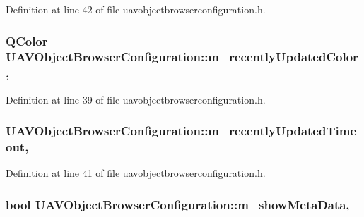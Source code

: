 Definition at line 42 of file uavobjectbrowserconfiguration.\-h.

\hypertarget{group___u_a_v_object_browser_plugin_ga37ba368816fa79530f01aa4447c2fc4d}{
\subsubsection[{m\-\_\-recently\-Updated\-Color}]{\setlength{\rightskip}{0pt plus 5cm}Q\-Color U\-A\-V\-Object\-Browser\-Configuration\-::m\-\_\-recently\-Updated\-Color\hspace{0.3cm}{\ttfamily [read]}, {\ttfamily [write]}}}\label{group___u_a_v_object_browser_plugin_ga37ba368816fa79530f01aa4447c2fc4d}


Definition at line 39 of file uavobjectbrowserconfiguration.\-h.

\hypertarget{group___u_a_v_object_browser_plugin_gabdd8aaa583badc5d3c7545480a372138}{
\subsubsection[{m\-\_\-recently\-Updated\-Timeout}]{ U\-A\-V\-Object\-Browser\-Configuration\-::m\-\_\-recently\-Updated\-Timeout\hspace{0.3cm}{\ttfamily [read]}, {\ttfamily [write]}}}\label{group___u_a_v_object_browser_plugin_gabdd8aaa583badc5d3c7545480a372138}


Definition at line 41 of file uavobjectbrowserconfiguration.\-h.

\hypertarget{group___u_a_v_object_browser_plugin_ga6ae11b3871f2da133017aeffa97aaa0b}{
\subsubsection[{m\-\_\-show\-Meta\-Data}]{\setlength{\rightskip}{0pt plus 5cm}bool U\-A\-V\-Object\-Browser\-Configuration\-::m\-\_\-show\-Meta\-Data\hspace{0.3cm}{\ttfamily [read]}, {\ttfamily [write]}}}\label{group___u_a_v_object_browser_plugin_ga6ae11b3871f2da133017aeffa97aaa0b}


